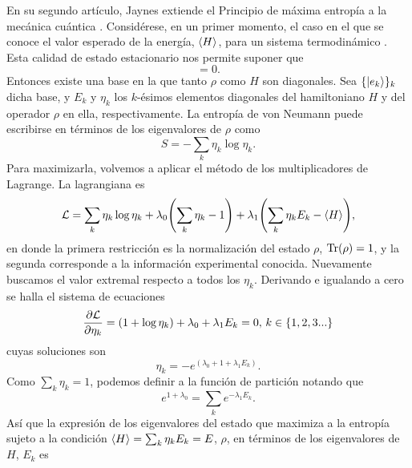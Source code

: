 
En su segundo artículo, Jaynes extiende el Principio de máxima entropía a la mecánica cuántica \cite{JaynesII}. Considérese, en un primer momento, el caso en el que se conoce el valor esperado de la energía, $\expval{H}$, para un sistema termodinámico . Esta calidad de estado estacionario nos permite suponer que
\begin{equation}
    [\rho,H]=0.\nonumber
\end{equation}
Entonces existe una base en la que tanto $\rho$ como $H$ son diagonales. Sea $\{\ket{e_{k}}\}_{k}$ dicha base, y $E_{k}$ y $\eta_{k}$ los $k$-ésimos elementos diagonales del hamiltoniano $H$ y del operador $\rho$ en ella, respectivamente. La entropía de von Neumann puede escribirse en términos de los eigenvalores de $\rho$ como
\begin{equation}
    S=-\sum_{k}\eta_{k}\log{\eta_{k}}.\nonumber
\end{equation}
Para maximizarla, volvemos a aplicar el método de los multiplicadores de Lagrange. La lagrangiana es
\begin{equation}
    \mathcal{L}=\sum_{k}\eta_{k}\log{\eta_{k}}+\lambda_{0}\qty(\sum_{k}\eta_{k}-1)+\lambda_{1}\qty(\sum_{k}\eta_{k}E_{k}-\expval{H}),\nonumber
\end{equation}
en donde la primera restricción es la normalización del estado $\rho$, $\Tr(\rho)=1$, y la segunda corresponde a la información experimental conocida. Nuevamente buscamos el valor extremal respecto a todos los $\eta_{k}$. Derivando e igualando a cero se halla el sistema de ecuaciones
\begin{equation}
    \frac{\partial \mathcal{L}}{\partial \eta_{k}}=(1+\log{\eta_{k}})+\lambda_{0}+\lambda_{1}E_{k}=0, \,k\in\{1,2,3...\}\nonumber
\end{equation}
cuyas soluciones son
\begin{equation}
    \eta_{k}=-e^{(\lambda_{0}+1+\lambda_{1}E_{k})}.\nonumber
\end{equation}
Como $\sum_{k}\eta_{k}=1$, podemos definir a la función de partición notando que
\begin{equation}
    e^{1+\lambda_{0}}=\sum_{k}e^{-\lambda_{1}E_{k}}.\nonumber
\end{equation}
Así que la expresión de los eigenvalores del estado que maximiza a la entropía sujeto a la condición $\expval{H}=\sum_{k}\eta_{k}E_{k}=E$, $\rho$, en términos de los eigenvalores de $H$, $E_{k}$ es
